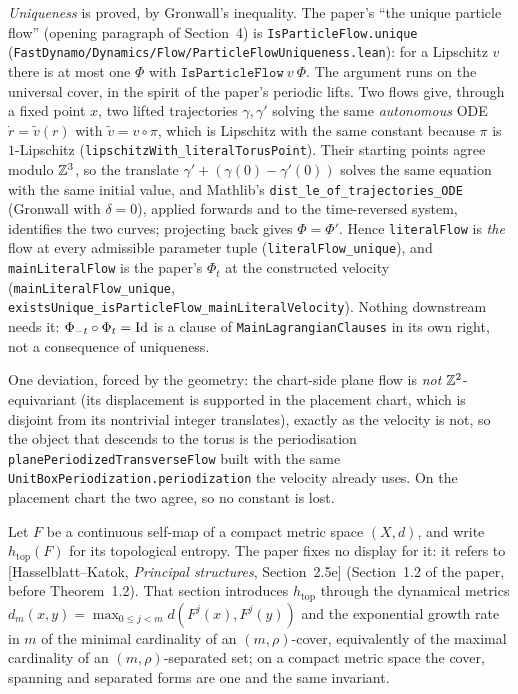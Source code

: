 \emph{Uniqueness} is proved, by Gronwall's inequality.  The paper's
``the unique particle flow'' (opening paragraph of Section~4) is
\texttt{IsParticleFlow.unique}
(\texttt{FastDynamo/Dynamics/Flow/ParticleFlowUniqueness.lean}): for a Lipschitz $v$ there is at
most one $\Phi$ with $\texttt{IsParticleFlow}\ v\ \Phi$.  The argument runs on the universal
cover, in the spirit of the paper's periodic lifts.  Two flows
give, through a fixed point $x$, two lifted trajectories $\gamma,\gamma'$ solving the same
\emph{autonomous} ODE $\dot r=\tilde v(r)$ with $\tilde v=v\circ\pi$, which is Lipschitz with
the same constant because $\pi$ is $1$-Lipschitz
(\texttt{lipschitzWith\_literalTorusPoint}).  Their starting points agree modulo $\mathbb{Z}^3$, so the
translate $\gamma'+(\gamma(0)-\gamma'(0))$ solves the same equation with the same initial value,
and Mathlib's \texttt{dist\_le\_of\_trajectories\_ODE} (Gronwall with $\delta=0$), applied
forwards and to the time-reversed system, identifies the two curves; projecting back gives
$\Phi=\Phi'$.  Hence \texttt{literalFlow} is \emph{the} flow at every admissible parameter
tuple (\texttt{literalFlow\_unique}), and \texttt{mainLiteralFlow} is the paper's
$\Phi_t$ at the constructed velocity (\texttt{mainLiteralFlow\_unique},
\texttt{existsUnique\_isParticleFlow\_mainLiteralVelocity}).  Nothing downstream needs it:
$\Phi_{-t}\circ\Phi_t=\mathrm{Id}$ is a clause of \texttt{MainLagrangianClauses} in its own right, not a
consequence of uniqueness.

One deviation, forced by the geometry: the chart-side plane flow is \emph{not}
$\mathbb{Z}^2$-equivariant (its displacement is supported in the placement chart, which is
disjoint from its nontrivial integer translates), exactly as the velocity is not, so the
object that descends to the torus is the periodisation
\texttt{planePeriodizedTransverseFlow} built with the same
\texttt{UnitBoxPeriodization.periodization} the velocity already uses.  On the placement
chart the two agree, so no constant is lost.

\begin{definition}
  \label{def:dynamics:topological-entropy}
  \leanok
  Let $F $ be a continuous self-map of a compact metric space $(X,d) $, and write
  $h_{\mathrm{top}}(F) $ for its topological entropy.  The paper fixes no display for
  it: it refers to [Hasselblatt--Katok, \emph{Principal structures}, Section~2.5e]
  (Section~1.2 of the paper, before Theorem~1.2).  That section introduces $h_{\mathrm{top}} $ through the dynamical metrics
  $d_m(x,y)=\max_{0\leq j<m}d(F^j(x),F^j(y)) $ and the exponential growth rate in $m $ of
  the minimal cardinality of an $(m,\rho) $-cover, equivalently of the maximal cardinality
  of an $(m,\rho) $-separated set; on a compact metric space the cover, spanning and
  separated forms are one and the same invariant.
\end{definition}


